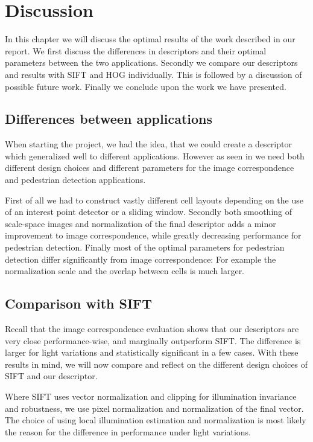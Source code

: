 \documentclass[thesis.tex]{subfiles}
\begin{document}
\chapter{Discussion}

In this chapter we will discuss the optimal results of the work described in our report.
We first discuss the differences in descriptors and their optimal parameters between the two applications. Secondly we compare our descriptors and results with SIFT and HOG individually.
This is followed by a discussion of possible future work. Finally we conclude upon the work we have presented.

\section{Differences between applications}
When starting the project, we had the idea, that we could create a descriptor which generalized well to different applications. However as seen in  we need both different design choices and different parameters for the image correspondence and pedestrian detection applications.

First of all we had to construct vastly different cell layouts depending on the use of an interest point detector or a sliding window. Secondly both smoothing of scale-space images and normalization of the final descriptor adds a minor improvement to image correspondence, while greatly decreasing performance for pedestrian detection. Finally most of the optimal parameters for pedestrian detection differ significantly from image correspondence: For example the normalization scale and the overlap between cells is much larger.
		
\section{Comparison with SIFT}
Recall that the image correspondence evaluation shows that our descriptors are very close performance-wise, and marginally outperform SIFT. The difference is larger for light variations and statistically significant in a few cases. With these results in mind, we will now compare and reflect on the different design choices of SIFT and our descriptor.

Where SIFT uses vector normalization and clipping for illumination invariance and robustness, we use pixel normalization and normalization of the final vector. The choice of using local illumination estimation and normalization is most likely the reason for the difference in performance under light variations.
\end{document}

